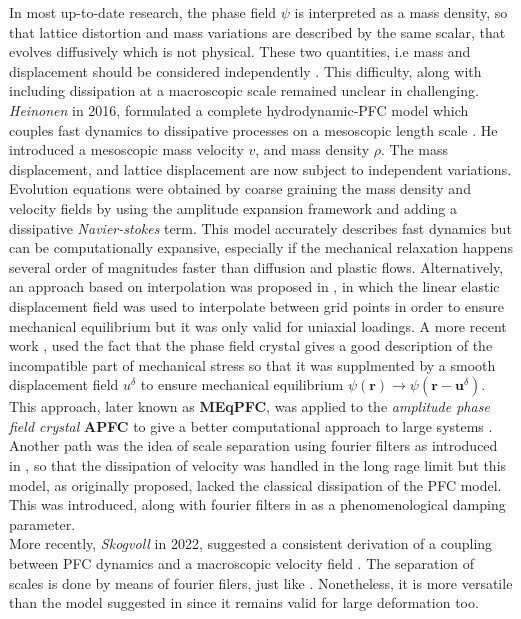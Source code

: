 \documentclass[11pt]{article}
\begin{document}
In most up-to-date research, the phase field $\psi$ is interpreted as a mass density, so that lattice distortion and mass variations are described by the same scalar, that evolves diffusively which is not physical. These two quantities, i.e mass and displacement should be considered independently \parencite{acharyaElasticityphase2022}. This difficulty, along with including dissipation at a macroscopic scale remained unclear in challenging. \emph{Heinonen} in 2016, formulated a complete hydrodynamic-PFC model which couples fast dynamics to dissipative processes on a mesoscopic length scale \parencite{heinonenConsistentHydrodynamics2016}. He introduced a mesoscopic mass velocity $v$, and mass density $\rho$. The mass displacement, and lattice displacement are now subject to independent variations. Evolution equations were obtained by coarse graining \parencite{athreyaRenormalizationgrouptheory2006} the mass density and velocity fields by using the amplitude expansion framework and adding a dissipative \emph{Navier-stokes} term. This model accurately describes fast dynamics but can be computationally expansive, especially if the mechanical relaxation happens several order of magnitudes faster than diffusion and plastic flows. Alternatively, an approach based on interpolation was proposed in \parencite{zhouMechanicalrelaxation2019}, in which the linear elastic displacement field was used to interpolate between grid points in order to ensure mechanical equilibrium but it was only valid for uniaxial loadings. A more recent work \parencite{skaugenSeparationElastic2018}, used the fact that the phase field crystal gives a good description of the incompatible part of mechanical stress so that it was supplmented by a smooth  displacement field $u^\delta$ to ensure mechanical equilibrium $\psi(\bm r) \rightarrow \psi(\bm r - \bm u ^\delta)$. This approach, later known as \textbf{MEqPFC}, was applied to the \emph{amplitude phase field crystal} \textbf{APFC} to give a better computational approach to large systems \parencite{salvalagliocoarsegrainedphasefield2020}.\\


Another path was the idea of scale separation using fourier filters as introduced in \parencite{tothNonlinearhydrodynamic2013}, so that the dissipation of velocity was handled in the long rage limit but this model, as originally proposed, lacked the classical dissipation of the PFC model. This was introduced, along with fourier filters in \parencite{podmaniczkyNucleationPostNucleation2021} as a phenomenological damping parameter.\\
More recently, \emph{Skogvoll} in 2022, suggested a consistent derivation of a coupling between PFC dynamics and a macroscopic velocity field \parencite{skogvollHydrodynamicphase2022}. The separation of scales is done by means of fourier filers, just like \parencite{tothNonlinearhydrodynamic2013}. Nonetheless, it is more versatile than the model suggested in \parencite{heinonenConsistentHydrodynamics2016} since it remains valid for large deformation too.
\end{document}
